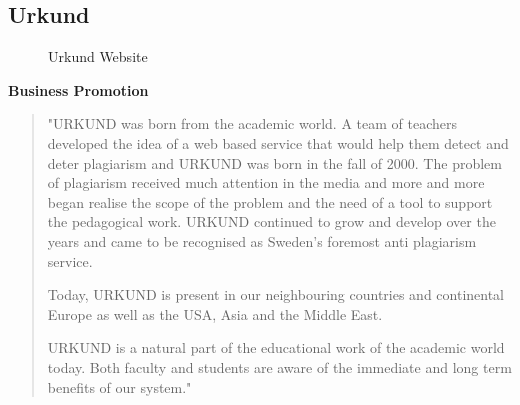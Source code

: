 \newpage
\subsection{Urkund}

 \begin{figure}[!h]
  \centering
  \caption{Urkund Website}
  \label{fig:Urkund Website}
\end{figure}

\textbf{Business Promotion}
\begin{quote}
"URKUND was born from the academic world. A team of teachers developed the idea of a web based service that would help them detect and deter plagiarism and URKUND was born in the fall of 2000. The problem of plagiarism received much attention in the media and more and more began realise the scope of the problem and the need of a tool to support the pedagogical work. URKUND continued to grow and develop over the years and came to be recognised as Sweden's foremost anti plagiarism service.

Today, URKUND is present in our neighbouring countries and continental Europe as well as the USA, Asia and the Middle East.

URKUND is a natural part of the educational work of the academic world today. Both faculty and students are aware of the immediate and long term benefits of our system."
\end{quote}\citep{UrkundTest}

